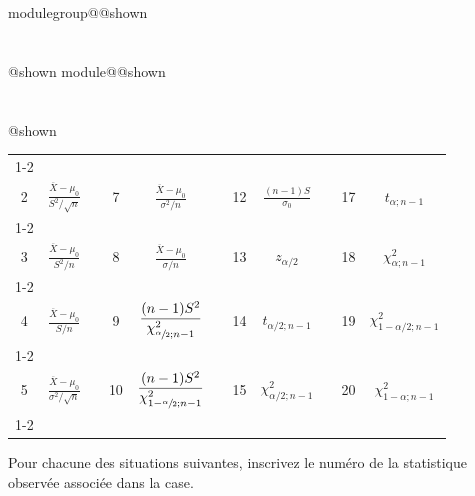 \documentclass{Evaluation}
\makeatletter
\newcommand{\currentmodulekey}{}
\newcommand{\currentmoduletitle}{}
\newcommand{\currentgroupkey}{}
\newcommand{\currentgrouptitle}{}
\newcommand{\showmoduleifneeded}{%
  \ifx\currentgroupkey\empty\else
    \expandafter\ifx\csname modulegroup@\currentgroupkey @shown\endcsname\relax
      \section*{\currentgrouptitle}%
      \expandafter\gdef\csname modulegroup@\currentgroupkey @shown\endcsname{1}%
    \fi
  \fi
  \expandafter\ifx\csname module@\currentmodulekey @shown\endcsname\relax
    \section*{\currentmoduletitle}%
    \expandafter\gdef\csname module@\currentmodulekey @shown\endcsname{1}%
  \fi
}
\newenvironment{A24}{\showmoduleifneeded}{}
\makeatother
\begin{document}
\begin{questions}
\begin{A24}
\begin{center}
\begin{tabular}{|c|c|c|c|c|c|c|c|c|c|c|}
\cline{1-2}\cline{4-5}\cline{7-8}\cline{10-11}&&&&&&&&&&\\[-3mm]
2 
& $\displaystyle \frac{\overline{X}-\mu_0}{S^2/\sqrt{n}}$
&  
& 7 
& $\displaystyle \frac{\overline{X}-\mu_0}{\sigma^2/n}$
&
&12
& $\displaystyle  \frac{ (n-1)S}{\sigma_0}$
&
&17
& $t_{\alpha;n-1}$
\\[4mm]
\cline{1-2}\cline{4-5}\cline{7-8}\cline{10-11}&&&&&&&&&&\\[-3mm]
3 
& $\displaystyle \frac{\overline{X}-\mu_0}{S^2/n}$
&  
& 8 
& $\displaystyle \frac{\overline{X}-\mu_0}{\sigma/n}$
&
&13
& $z_{\alpha/2}$
&
&18
& $\chi^2_{\alpha;n-1}$
\\[4mm]
\cline{1-2}\cline{4-5}\cline{7-8}\cline{10-11}&&&&&&&&&&\\[-3mm]
4 
& $\displaystyle \frac{\overline{X}-\mu_0}{S/n}$
&  
& 9 
& $\displaystyle\frac{ (n-1)S^2}{ \chi_{\sfrac{\alpha}{2};n-1}^2}$
&
&14
& $t_{\alpha/2;n-1}$
&
&19
& $\chi^2_{1-\alpha/2;n-1}$
\\[4mm]
\cline{1-2}\cline{4-5}\cline{7-8}\cline{10-11}&&&&&&&&&&\\[-3mm]
5 
& $\displaystyle \frac{\overline{X}-\mu_0}{\sigma^2/\sqrt{n}}$
&  
& 10 
& $\displaystyle\frac{ (n-1)S^2}{ \chi_{1-\sfrac{\alpha}{2};n-1}^2}$
&
&15
& $\chi^2_{\alpha/2;n-1}$
&
&20
& $\chi^2_{1-\alpha;n-1}$
\\[4mm]
\cline{1-2}\cline{4-5}\cline{7-8}\cline{10-11}
\end{tabular}

\end{center}

Pour chacune des situations suivantes, inscrivez le numéro de la statistique observée associée dans la case.

\vspace{0.3cm}
\end{A24}
\end{questions}
\end{document}
